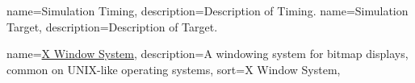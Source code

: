 \newcommand{\dvttermttm}{\dvtcmdabbrev{dvtglossttm}}
{
  name=Simulation Timing,
  description={Description of Timing.}
}
\newcommand{\dvttermtiming}{\dvtcmdcaponcegloss{dvtglosstiming}{Timing}}
{
  name=Simulation Target,
  description={Description of Target.}
}
\newcommand{\dvttermtarget}{\dvtcmdcaponcegloss{dvtglosstarget}{Target}}

\newcommand{\dvttermuart}{\dvtcmdabbrev{dvtglossuart}}

\newcommand{\dvttermvirtutech}{Virtutech}
\newcommand{\dvttermvmware}{VMware, Inc.}
\newcommand{\dvttermvalve}{Valve Corporation}

\newcommand{\dvttermwarp}{\dvttermmicrosoft\ \dvtcmdabbrev{dvtglosswarp}}
\newcommand{\dvttermwindriver}{Wind River Systems, Inc.}
\newcommand{\dvttermwindows}{Windows}

{
  name=\href{http://en.wikipedia.org/wiki/X_Window_System}{X Window System},
  description={A windowing system for bitmap displays, common on UNIX-like operating systems},
  sort={X Window System}, %
}
\newcommand{\dvttermxeleven}{\glslink{dvtglossxeleven}{X11}}
\newcommand{\dvttermxeightysix}{x86}

